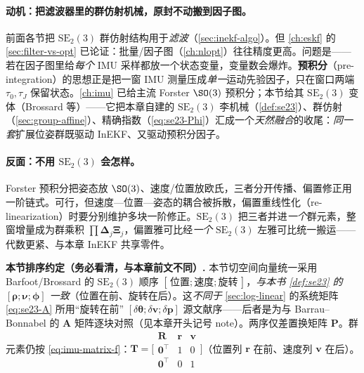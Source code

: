 \paragraph{动机：把滤波器里的群仿射机械，原封不动搬到因子图。}
前面各节把 $\mathrm{SE}_2(3)$ 群仿射结构用于\emph{滤波}（\cref{sec:inekf-algo}）。但 \cref{ch:eskf} 的 \cref{sec:filter-vs-opt} 已论证：批量/因子图（\cref{ch:nlopt}）往往精度更高。问题是——若在因子图里给\emph{每个} IMU 采样都放一个状态变量，变量数会爆炸。\textbf{预积分}（pre-integration）的思想正是把一窗 IMU 测量压成\emph{单一}运动先验因子，只在窗口两端 $\tau_0,\tau_J$ 保留状态\cite{forster2017preintegration}。\cref{ch:imu} 已给主流 Forster $\SO(3)$ 预积分；本节给其 $\mathrm{SE}_2(3)$ 变体（Brossard 等\cite{brossard2021associating}）——它把本章自建的 $\mathrm{SE}_2(3)$ 李机械（\cref{def:se23}）、群仿射（\cref{sec:group-affine}）、精确指数（\cref{eq:se23-Phi}）汇成一个\emph{天然融合}的收尾：\emph{同一套}扩展位姿群既驱动 InEKF、又驱动预积分因子。

\paragraph{反面：不用 $\mathrm{SE}_2(3)$ 会怎样。}
Forster 预积分把姿态放 $\SO(3)$、速度/位置放欧氏，三者分开传播、偏置修正用一阶链式。可行，但速度—位置—姿态的耦合被拆散，偏置重线性化（re-linearization）时要分别维护多块一阶修正。$\mathrm{SE}_2(3)$ 把三者并进\emph{一个}群元素，整窗增量成为群乘积 $\prod\boldsymbol{\Delta}_j\boldsymbol{\Xi}_j$，偏置雅可比经\emph{一个} $\mathrm{SE}_2(3)$ 左雅可比统一搬运——代数更紧、与本章 InEKF 共享零件。

\begin{note}
\textbf{本节排序约定（务必看清，与本章前文不同）.}\;
本节切空间向量统一采用 Barfoot/Brossard 的 $\mathrm{SE}_2(3)$ 顺序 $[\,\text{位置};\text{速度};\text{旋转}\,]$，\emph{与本书 \cref{def:se23} 的 $[\boldsymbol{\rho};\boldsymbol{\nu};\boldsymbol{\phi}]$ 一致}（位置在前、旋转在后）。这\emph{不同于} \cref{sec:log-linear} 的系统矩阵 \cref{eq:se23-A} 所用“旋转在前” $[\delta\boldsymbol{\theta};\delta\mathbf{v};\delta\mathbf{p}]$ 源文献序——后者是为与 Barrau--Bonnabel 的 $\mathbf{A}$ 矩阵逐块对照（见本章开头记号 note）。两序仅差置换矩阵 $\mathbf{P}$。群元素仍按 \cref{eq:imu-matrix-f}：$\mathbf{T}=\big[\begin{smallmatrix}\mathbf{R}&\mathbf{r}&\mathbf{v}\\\mathbf{0}^\top&1&0\\\mathbf{0}^\top&0&1\end{smallmatrix}\big]$（位置列 $\mathbf{r}$ 在前、速度列 $\mathbf{v}$ 在后）。
\end{note}

